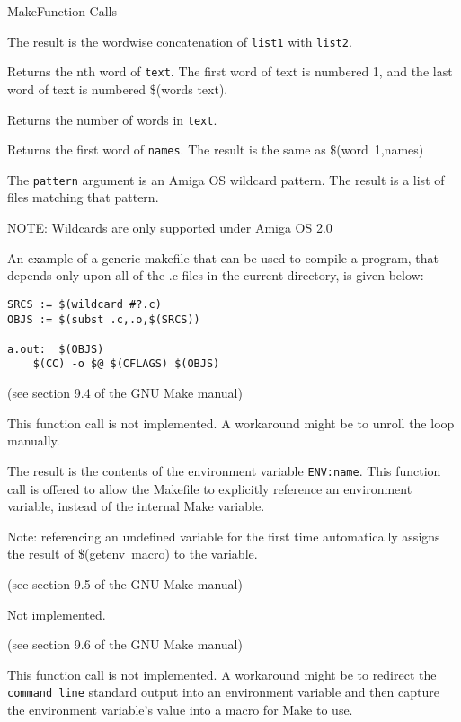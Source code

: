 \begin{manpage}{Make}{Function Calls}{}
\separator
{}

The result is the wordwise concatenation of {\tt list1} with {\tt list2}.

\separator
{}

Returns the nth word of {\tt text}.  The first word of text is numbered
1, and the last word of text is numbered \$(words text).

\separator
{}

Returns the number of words in {\tt text}.

\separator
{}

Returns the first word of {\tt names}.  The result is the same as
\$(word~1,names)

\separator
{}

The {\tt pattern} argument is an Amiga OS wildcard pattern.  The result is
a list of files matching that pattern.

NOTE:  Wildcards are only supported under Amiga OS 2.0

An example of a generic makefile that can be used to compile a program,
that depends only upon all of the .c files in the current directory, is
given below:


\begin{verbatim}
SRCS := $(wildcard #?.c)
OBJS := $(subst .c,.o,$(SRCS))

a.out:	$(OBJS)
    $(CC) -o $@ $(CFLAGS) $(OBJS)
\end{verbatim}


\subtitle{Special Functions}

\separator
{}

(see section 9.4 of the GNU Make manual)

This function call is not implemented.  A workaround might be to unroll the
loop manually.

\separator
{}

The result is the contents of the environment variable {\tt ENV:name}.
This function call is offered to allow the Makefile to explicitly reference
an environment variable, instead of the internal Make variable.

Note:  referencing an undefined variable for the first time automatically
assigns the result of \$(getenv~macro) to the variable.

\separator
{}

(see section 9.5 of the GNU Make manual)

Not implemented.

\separator
{}

(see section 9.6 of the GNU Make manual)

This function call is not implemented.  A workaround might be to redirect
the {\tt command~line} standard output into an environment variable and
then capture the environment variable's value into a macro for Make to use.

\end{manpage}


